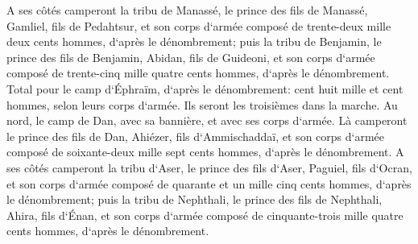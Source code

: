 \verse A ses côtés camperont la tribu de Manassé, le prince des fils de Manassé, Gamliel, fils de Pedahtsur, 
\verse et son corps d`armée composé de trente-deux mille deux cents hommes, d`après le dénombrement; 
\verse puis la tribu de Benjamin, le prince des fils de Benjamin, Abidan, fils de Guideoni, 
\verse et son corps d`armée composé de trente-cinq mille quatre cents hommes, d`après le dénombrement. 
\verse Total pour le camp d`Éphraïm, d`après le dénombrement: cent huit mille et cent hommes, selon leurs corps d`armée. Ils seront les troisièmes dans la marche. 
\verse Au nord, le camp de Dan, avec sa bannière, et avec ses corps d`armée. Là camperont le prince des fils de Dan, Ahiézer, fils d`Ammischaddaï, 
\verse et son corps d`armée composé de soixante-deux mille sept cents hommes, d`après le dénombrement. 
\verse A ses côtés camperont la tribu d`Aser, le prince des fils d`Aser, Paguiel, fils d`Ocran, 
\verse et son corps d`armée composé de quarante et un mille cinq cents hommes, d`après le dénombrement; 
\verse puis la tribu de Nephthali, le prince des fils de Nephthali, Ahira, fils d`Énan, 
\verse et son corps d`armée composé de cinquante-trois mille quatre cents hommes, d`après le dénombrement. 
